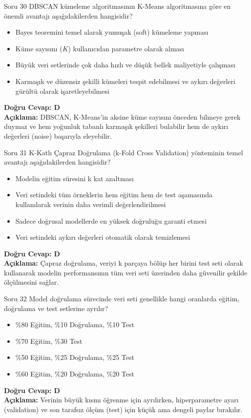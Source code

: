 \documentclass[12pt,a4paper]{article}
\begin{document}
\begin{testcard}{Soru 30}
    DBSCAN kümeleme algoritmasının K-Means algoritmasına göre en önemli avantajı aşağıdakilerden hangisidir?
    \begin{itemize}
        \item[A)] Bayes teoremini temel alarak yumuşak (soft) kümeleme yapması
        \item[B)] Küme sayısını ($K$) kullanıcıdan parametre olarak alması
        \item[C)] Büyük veri setlerinde çok daha hızlı ve düşük bellek maliyetiyle çalışması
        \item[D)] Karmaşık ve düzensiz şekilli kümeleri tespit edebilmesi ve aykırı değerleri gürültü olarak işaretleyebilmesi
    \end{itemize}
    \textbf{Doğru Cevap: D} \\
    \textbf{Açıklama:} DBSCAN, K-Means'in aksine küme sayısını önceden bilmeye gerek duymaz ve hem yoğunluk tabanlı karmaşık şekilleri bulabilir hem de aykırı değerleri (noise) başarıyla eleyebilir.
\end{testcard}

\begin{testcard}{Soru 31}
    K-Katlı Çapraz Doğrulama (k-Fold Cross Validation) yönteminin temel avantajı aşağıdakilerden hangisidir?
    \begin{itemize}
        \item[A)] Modelin eğitim süresini k kat azaltması
        \item[B)] Veri setindeki tüm örneklerin hem eğitim hem de test aşamasında kullanılarak verinin daha verimli değerlendirilmesi
        \item[C)] Sadece doğrusal modellerde en yüksek doğruluğu garanti etmesi
        \item[D)] Veri setindeki aykırı değerleri otomatik olarak temizlemesi
    \end{itemize}
    \tcblower
    \textbf{Doğru Cevap: D} \\
    \textbf{Açıklama:} Çapraz doğrulama, veriyi k parçaya bölüp her birini test seti olarak kullanarak modelin performansının tüm veri seti üzerinden daha güvenilir şekilde ölçülmesini sağlar.
\end{testcard}

\begin{testcard}{Soru 32}
    Model doğrulama sürecinde veri seti genellikle hangi oranlarda eğitim, doğrulama ve test setlerine ayrılır?
    \begin{itemize}
        \item[A)] \%80 Eğitim, \%10 Doğrulama, \%10 Test
        \item[B)] \%70 Eğitim, \%30 Test
        \item[C)] \%50 Eğitim, \%25 Doğrulama, \%25 Test
        \item[D)] \%60 Eğitim, \%20 Doğrulama, \%20 Test
    \end{itemize}
    \tcblower
    \textbf{Doğru Cevap: D} \\
    \textbf{Açıklama:} Verinin büyük kısmı öğrenme için ayrılırken, hiperparametre ayarı (validation) ve son tarafsız ölçüm (test) için küçük ama dengeli paylar bırakılır.
\end{testcard}
\end{document}
